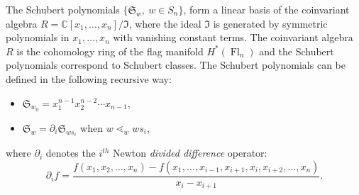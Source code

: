 \documentclass[ALCO,ThmDefs,Unicode,epreuves]{cedram}
\newcommand{\Cbb}{\mathbb{C}}
\newcommand{\I}{\mathfrak{I}}
\DeclareMathOperator{\Fl}{Fl}
\begin{document}
The Schubert polynomials $\{\mathfrak{S}_w,\ w\in S_n\}$, form a linear basis of the coinvariant algebra $R=\Cbb[x_1,\ldots,x_n]/\I$, where the ideal $\I$ is generated by symmetric polynomials in $x_1,\ldots,x_n$ with vanishing constant terms. The coinvariant algebra $R$ is the cohomology ring of the flag manifold $H^*(\Fl_n)$ and the Schubert polynomials correspond to Schubert classes. The Schubert polynomials can be defined in the following recursive way:
\begin{itemize}
\item $\mathfrak{S}_{w_0}=x_1^{n-1}x_2^{n-2}\cdots x_{n-1}$,
\item $\mathfrak{S}_w=\partial_i\mathfrak{S}_{ws_i}$ when $w\lessdot_w ws_i$,
\end{itemize}
where $\partial_i$ denotes the $i^{th}$ Newton \emph{divided difference} operator:
\[
\partial_i f=\frac{f(x_1,x_2,\ldots,x_n)-f(x_1,\ldots,x_{i-1},x_{i+1},x_i,x_{i+2},\ldots,x_n)}{x_i-x_{i+1}}.
\]
\end{document}
